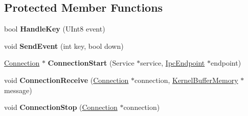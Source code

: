 \subsection*{Protected Member Functions}
\begin{DoxyCompactItemize}
\item 
\mbox{\label{class_generic_keyboard_a7e7e2702466ab806a76e1db77adc832a}} 
bool {\bfseries Handle\+Key} (U\+Int8 event)
\item 
\mbox{\label{class_generic_keyboard_ae3a3b36c55bf4761fe69fed8f4579ac2}} 
void {\bfseries Send\+Event} (int key, bool down)
\item 
\mbox{\label{class_generic_keyboard_a1582672c49773e3095c25d5b73991d57}} 
\hyperlink{class_provider_driver_1_1_connection}{Connection} $\ast$ {\bfseries Connection\+Start} (Service $\ast$service, \hyperlink{class_ipc_endpoint}{Ipc\+Endpoint} $\ast$endpoint)
\item 
\mbox{\label{class_generic_keyboard_a334c6ddbc5046b15d7096132e6473107}} 
void {\bfseries Connection\+Receive} (\hyperlink{class_provider_driver_1_1_connection}{Connection} $\ast$connection, \hyperlink{class_kernel_buffer_memory}{Kernel\+Buffer\+Memory} $\ast$message)
\item 
\mbox{\label{class_generic_keyboard_a23a3fedb20cb8f4cbc6815c6df6084f8}} 
void {\bfseries Connection\+Stop} (\hyperlink{class_provider_driver_1_1_connection}{Connection} $\ast$connection)
\end{DoxyCompactItemize}
